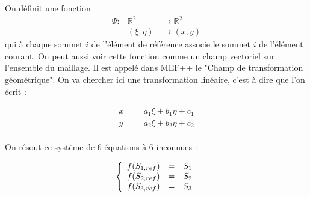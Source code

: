 \documentclass[a4paper,12pt]{article}
\begin{document}
\begin{center}
\end{center}

On définit une fonction 
\begin{eqnarray*}
\Psi : &\mathbb{R}^{2}& \rightarrow \mathbb{R}^{2} \\
&(\xi, \eta)& \rightarrow (x,y)
\end{eqnarray*}
qui à chaque sommet $i$ de l'élément de référence associe le sommet $i$ de l'élément courant. On peut aussi voir cette fonction comme un champ vectoriel sur l'ensemble du maillage.
Il est appelé dans MEF++ le "Champ de transformation géométrique". On va chercher ici une transformation linéaire, c'est à dire que l'on écrit :

\begin{eqnarray*}
x &=& a_{1} \xi + b_{1} \eta + c_{1} \\
y &=& a_{2} \xi + b_{2} \eta + c_{2} \\
\end{eqnarray*}

On résout ce système de 6 équations à 6 inconnues : 

\[
\left\{
\begin{array}{r c l}
f(S_{1, ref}) &=& S_{1} \\
f(S_{2, ref}) &=& S_{2} \\
f(S_{3, ref}) &=& S_{3} \\
\end{array}
\right.
\]
\end{document}
